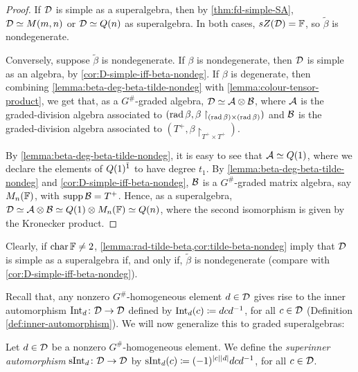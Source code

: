 \begin{proof}
    If $\mathcal{D}$ is simple as a superalgebra, then by \cref{thm:fd-simple-SA}, $\mathcal{D} \simeq M(m,n)$ or $\mathcal{D} \simeq Q(n)$ as superalgebra. 
    In both cases, $sZ(\mathcal{D}) = \mathbb{F}$, so $\tilde\beta$ is nondegenerate.

    Conversely, suppose $\tilde\beta$ is nondegenerate. 
    If $\beta$ is nondegenerate, then $\mathcal{D}$ is simple as an algebra, by \cref{cor:D-simple-iff-beta-nondeg}.  
    If $\beta$ is degenerate, then combining  \cref{lemma:beta-deg-beta-tilde-nondeg} with \cref{lemma:colour-tensor-product}, we get that, as a $G^\#$-graded algebra, $\mathcal{D} \simeq \mathcal A \otimes \mathcal B$, where $\mathcal A$ is the graded-division algebra associated to $(\operatorname{rad} \beta, \beta\restriction_{(\operatorname{rad} \beta)\times (\operatorname{rad} \beta)})$ and $\mathcal B$ is the graded-division algebra associated to $(T^+, \beta\restriction_{T^+ \times T^+})$. 
    
    By \cref{lemma:beta-deg-beta-tilde-nondeg}, it is easy to see that $\mathcal A \simeq Q(1)$, where we declare the elements of $Q(1)^{\bar1}$ to have degree $t_1$. 
    By \cref{lemma:beta-deg-beta-tilde-nondeg} and \cref{cor:D-simple-iff-beta-nondeg}, $\mathcal B$ is a $G^\#$-graded matrix algebra, say $M_n(\mathbb{F})$, with $\operatorname{supp} \mathcal B = T^+$. 
    Hence, as a superalgebra, $\mathcal{D} \simeq \mathcal A \otimes \mathcal B \simeq Q(1) \otimes M_n(\mathbb{F}) \simeq Q(n)$, where the second isomorphism is given by the Kronecker product. 
\end{proof}

\begin{remark}\label{rmk:D-simple-iff-tilde-beta-nondeg}
    Clearly, if $\operatorname{char} \mathbb{F} \neq 2$, \cref{lemma:rad-tilde-beta,cor:tilde-beta-nondeg} imply that $\mathcal{D}$ is simple as a superalgebra if, and only if, $\tilde\beta $ is nondegenerate (compare with \cref{cor:D-simple-iff-beta-nondeg}). 
\end{remark}

Recall that, any nonzero $G^\#$-homogeneous element $d\in \mathcal{D}$ gives rise to the inner automorphism $\operatorname{Int}_d\colon \mathcal{D} \to \mathcal{D}$ defined by $\operatorname{Int}_d (c) \coloneqq dcd^{-1}$, for all $c\in \mathcal{D}$ (Definition \ref{def:inner-automorphism}). 
We will now generalize this to graded superalgebras:

\begin{defi}\label{def:superinner}
	Let $d\in \mathcal{D}$ be a nonzero $G^\#$-homogeneous element.
	We define the \emph{superinner automorphism} $\operatorname{sInt}_d\colon \mathcal{D} \to \mathcal{D}$ by $\operatorname{sInt}_d (c) \coloneqq (-1)^{|c||d|} dcd^{-1}$, for all $c\in \mathcal{D}$.
\end{defi}

